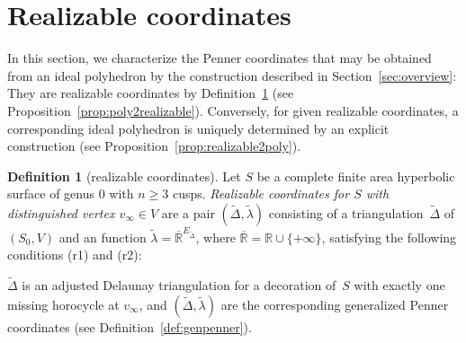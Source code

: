 \documentclass[a4paper, 11pt]{article}
\newcommand{\R}{\mathbb{R}}
\newcommand{\Rbar}{\overline{\R}}
\newcommand{\Deltil}{\widetilde{\Delta}}
\newcommand{\lamtil}{\tilde{\lambda}}
\theoremstyle{plain}
\theoremstyle{definition}
\newtheorem{definition}[theorem]{Definition}
\begin{document}
\section{Realizable coordinates}
\label{sec:realizable}

In this section, we characterize the Penner coordinates that may be
obtained from an ideal polyhedron by the construction described in
Section~\ref{sec:overview}: They are realizable coordinates by
Definition~\ref{def:realizable} (see
Proposition~\ref{prop:poly2realizable}). Conversely, for given
realizable coordinates, a corresponding ideal polyhedron is uniquely
determined by an explicit construction (see
Proposition~\ref{prop:realizable2poly}).

\begin{definition}[realizable coordinates]
  \label{def:realizable}
  Let $S$ be a complete finite area hyperbolic surface of
  genus $0$ with $n\geq 3$ cusps. \emph{Realizable coordinates for $S$
    with distinguished vertex $v_{\infty}\in V$} are a pair
  $(\Deltil,\lamtil)$ consisting of a triangulation~$\Deltil$ of
  $(S_{0},V)$ and an function $\lamtil=\Rbar^{E_{\Deltil}}$, where
  $\Rbar=\R\cup\{+\infty\}$, satisfying the following conditions (r1)
  and (r2):
  \begin{compactenum}[(r1)]
  \item $\Deltil$ is an adjusted Delaunay triangulation for a
    decoration of~$S$ with exactly one missing horocycle at
    $v_{\infty}$, and $(\Deltil,\lamtil)$ are the corresponding
    generalized Penner coordinates (see Definition~\ref{def:genpenner}).


\end{compactenum}
\end{definition}
\end{document}
